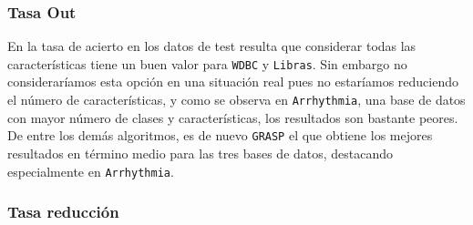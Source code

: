\documentclass[11pt,leqno]{article}
\begin{document}
\subsubsection{Tasa Out}
\begin{center}
\end{center}

En la tasa de acierto en los datos de test resulta que considerar todas las características tiene un buen valor para \texttt{WDBC} y \texttt{Libras}. Sin embargo no consideraríamos esta opción en una situación real pues no estaríamos reduciendo el número de características, y como se observa en \texttt{Arrhythmia}, una base de datos con mayor número de clases y características, los resultados son bastante peores. De entre los demás algoritmos, es de nuevo \texttt{GRASP} el que obtiene los mejores resultados en término medio para las tres bases de datos, destacando especialmente en \texttt{Arrhythmia}.

\subsubsection{Tasa reducción}
\begin{center}
\end{center}
\end{document}
